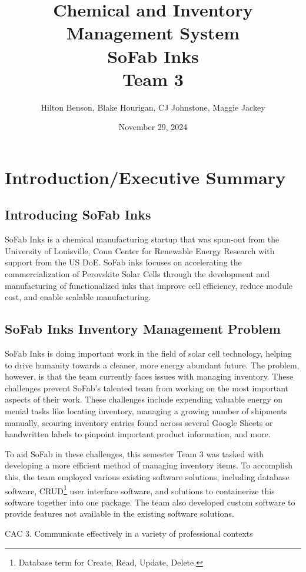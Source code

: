\documentclass{article}
\title{Chemical and Inventory Management System \\ SoFab Inks \\ Team 3}
\date{November 29, 2024}
\author{Hilton Benson, Blake Hourigan, CJ Johnstone, Maggie Jackey}
\begin{document}
  
\maketitle
\clearpage
\tableofcontents
\clearpage

\section{Introduction\slash Executive Summary} 
\subsection{Introducing SoFab Inks}
SoFab Inks is a chemical manufacturing startup that was spun-out from the University of Louisville, Conn Center for Renewable Energy 
Research with support from the US DoE. SoFab inks focuses on accelerating the commercialization of Perovskite Solar Cells 
through the development and manufacturing of functionalized inks that improve cell efficiency, reduce module cost, and enable scalable 
manufacturing. \cite{sofabinks}
\subsection{SoFab Inks Inventory Management Problem}
SoFab Inks is doing important work in the field of solar cell technology, helping to drive humanity towards a cleaner, more energy 
abundant future. The problem, however, is that the team currently faces issues with managing inventory. These challenges prevent SoFab's
talented team from working on the most important aspects of their work. These challenges include expending valuable energy on menial 
tasks like locating inventory, managing a growing number of shipments manually, scouring inventory entries found across several 
Google Sheets or handwritten labels to pinpoint important product information, and more. 

To aid SoFab in these challenges, this semester Team 3 was tasked with developing a more efficient method of managing inventory items. 
To accomplish this, the team employed various existing software solutions, including database software, CRUD\footnote{Database term
for Create, Read, Update, Delete.} user interface software, and solutions to containerize this software together into one package. The 
team also developed custom software to provide features not available in the existing software solutions. 

CAC 3. Communicate effectively in a variety of professional contexts 
\end{document}
